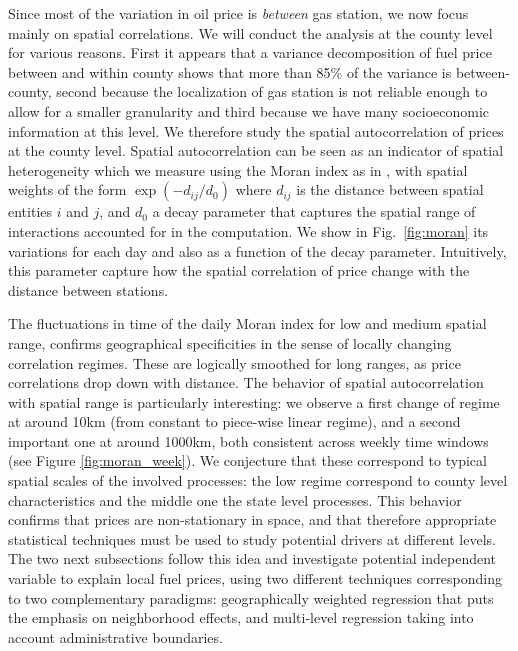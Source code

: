 \documentclass[10pt]{article}
\begin{document}
Since most of the variation in oil price is \emph{between} gas station, we now focus mainly on spatial correlations. We will conduct the analysis at the county level for various reasons. First it appears that a variance decomposition of fuel price between and within county shows that more than 85\% of the variance is between-county, second because the localization of gas station is not reliable enough to allow for a smaller granularity and third because we have many socioeconomic information at this level. We therefore study the spatial autocorrelation of prices at the county level. Spatial autocorrelation can be seen as an indicator of spatial heterogeneity which we measure using the Moran index as in \cite{tsai2005quantifying}, with spatial weights of the form $\exp{\left(-d_{ij} / d_0 \right)}$ where $d_{ij}$ is the distance between spatial entities $i$ and $j$, and $d_0$ a decay parameter that captures the spatial range of interactions accounted for in the computation. We show in Fig.~\ref{fig:moran} its variations for each day and also as a function of the decay parameter. Intuitively, this parameter capture how the spatial correlation of price change with the distance between stations.

The fluctuations in time of the daily Moran index for low and medium spatial range, confirms geographical specificities in the sense of locally changing correlation regimes. These are logically smoothed for long ranges, as price correlations drop down with distance. The behavior of spatial autocorrelation with spatial range is particularly interesting: we observe a first change of regime at around 10km (from constant to piece-wise linear regime), and a second important one at around 1000km, both consistent across weekly time windows (see Figure \ref{fig:moran_week}). We conjecture that these correspond to typical spatial scales of the involved processes: the low regime correspond to county level characteristics and the middle one the state level processes. This behavior confirms that prices are non-stationary in space, and that therefore appropriate statistical techniques must be used to study potential drivers at different levels. The two next subsections follow this idea and investigate potential independent variable to explain local fuel prices, using two different techniques corresponding to two complementary paradigms: geographically weighted regression that puts the emphasis on neighborhood effects, and multi-level regression taking into account administrative boundaries.
\end{document}
